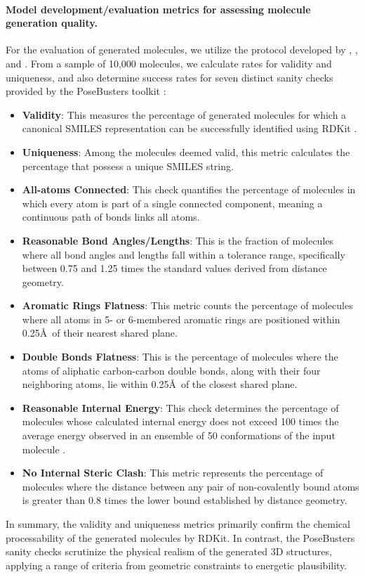 \documentclass{article}
\theoremstyle{plain}
\theoremstyle{definition}
\theoremstyle{remark}
\begin{document}
\paragraph{Model development/evaluation metrics for assessing molecule generation quality.}
For the evaluation of generated molecules, we utilize the protocol developed by \citet{hoogeboom2022equivariant}, \citet{daigavane2024symphony}, and \citet{joshi2025allatom}. From a sample of 10,000 molecules, we calculate rates for validity and uniqueness, and also determine success rates for seven distinct sanity checks provided by the PoseBusters toolkit \citep{buttenschoen2024posebusters}:
\begin{itemize}
    \item \textbf{Validity}: This measures the percentage of generated molecules for which a canonical SMILES representation can be successfully identified using RDKit \citep{landrum2013rdkit}.
    \item \textbf{Uniqueness}: Among the molecules deemed valid, this metric calculates the percentage that possess a unique SMILES string.
    \item \textbf{All-atoms Connected}: This check quantifies the percentage of molecules in which every atom is part of a single connected component, meaning a continuous path of bonds links all atoms.
    \item \textbf{Reasonable Bond Angles/Lengths}: This is the fraction of molecules where all bond angles and lengths fall within a tolerance range, specifically between 0.75 and 1.25 times the standard values derived from distance geometry.
    \item \textbf{Aromatic Rings Flatness}: This metric counts the percentage of molecules where all atoms in 5- or 6-membered aromatic rings are positioned within 0.25\AA\ of their nearest shared plane.
    \item \textbf{Double Bonds Flatness}: This is the percentage of molecules where the atoms of aliphatic carbon-carbon double bonds, along with their four neighboring atoms, lie within 0.25\AA\ of the closest shared plane.
    \item \textbf{Reasonable Internal Energy}: This check determines the percentage of molecules whose calculated internal energy does not exceed 100 times the average energy observed in an ensemble of 50 conformations of the input molecule \citep{harris2023posecheck}.
    \item \textbf{No Internal Steric Clash}: This metric represents the percentage of molecules where the distance between any pair of non-covalently bound atoms is greater than 0.8 times the lower bound established by distance geometry.
\end{itemize}
In summary, the validity and uniqueness metrics primarily confirm the chemical processability of the generated molecules by RDKit. In contrast, the PoseBusters sanity checks scrutinize the physical realism of the generated 3D structures, applying a range of criteria from geometric constraints to energetic plausibility.
\end{document}
